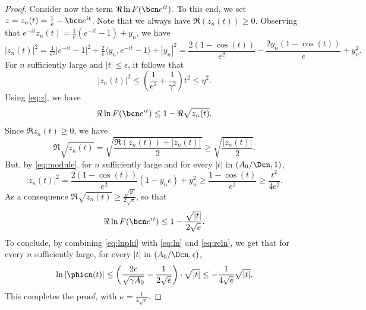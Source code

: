 \begin{proof}
Consider now the term $\Re \ln F( \bcn e^{it})$.
To this end, we set $z=z_{n}(t)=\tfrac{1}{e}-\bcn e^{it}$.
Note that we always have $\Re(z_n(t)) \ge 0$.
Observing that $e^{-it} z_{n}(t)= \tfrac{1}{e}(e^{-it}-1)+y_n$, we have
\begin{equation}
  \label{eq:module} |z_{n}(t)|^{2}=  \tfrac{1}{e^2} \big|e^{-it}-1\big|^2
  +\tfrac{2}{e} \big\langle y_n, e^{-it}-1 \big\rangle +|y_n|^2
  = \frac{2(1-\cos(t))}{e^{2}} -\frac{2 y_{n}(1-\cos(t))}{e}+y_{n}^{2}.
\end{equation}
For $n$ sufficiently large and $|t| \leq \epsilon$, it follows that
\begin{equation}
\label{ineq:module} |z_{n}(t)|^{2} \leq  \left( \frac{1}{e^{2}} + \frac{1}{\gamma^{2}} \right)  t^{2} \leq \eta^{2}.
\end{equation}
Using \eqref{eq:z}, we have
\[\Re \ln F( \bcn e^{it}) \leq 1-   \Re \sqrt{z_{n}(t)}.\]
Since $\Re z_{n}(t) \ge 0$, we have
\[ \Re \sqrt{z_{n}(t)}=\sqrt{\frac{\Re(z_n(t))+|z_n(t)|}{2}} \ge \sqrt{\frac{|z_n(t)|}{2}}. \]
But, by \eqref{eq:module}, for $n$ sufficiently large and  for every $|t|$ in $(A_{0}/\Dcn,1)$,
\[|z_{n}(t)|^{2} = \frac{2(1-\cos(t))}{e^{2}} (1-y_{n} e)+y_{n}^{2} \geq \frac{1-\cos(t)}{e^{2}} \geq  \frac{t^{2}}{4e^{2}}.\]
As a consequence $\Re \sqrt{z_{n}(t)} \geq \frac{\sqrt{|t|}}{2\sqrt{e}}$, so that
\begin{equation}
\label{eq:reln}\Re \ln F( \bcn e^{it}) \leq 1- \frac{\sqrt{|t|}}{2\sqrt{e}}.
\end{equation}
To conclude, by combining \eqref{eq:lnphi} with \eqref{eq:ln} and \eqref{eq:reln},
we get that for every $n$ sufficiently large, for every $|t|$ in $(A_{0}/\Dcn, \epsilon)$,
\[\ln|\phicn(t)| \leq \left(  \frac{2c}{\sqrt{\gamma A_{0}}}- \frac{1}{2\sqrt{e}} \right) \cdot \sqrt{|t|} \leq -\frac{1}{4\sqrt{e}} \sqrt{|t|}.\]
This completes the proof, with $\kappa= \frac{1}{4\sqrt{e}}$.
\end{proof}


